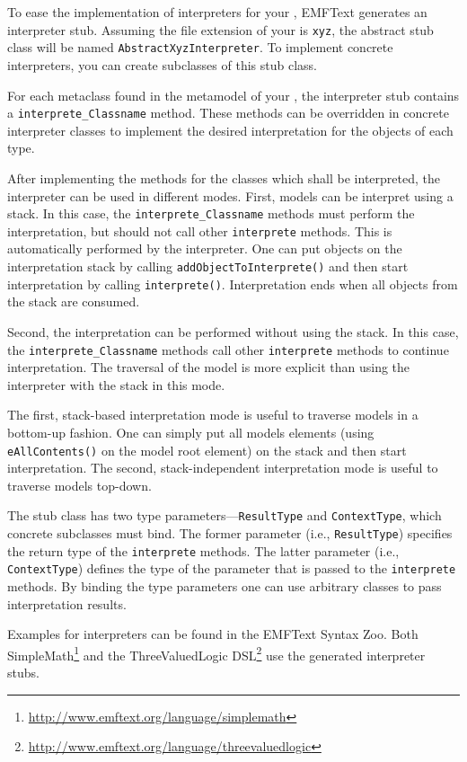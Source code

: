 To ease the implementation of interpreters for your \DSL, EMFText generates an
interpreter stub. Assuming the file extension of your \DSL is \texttt{xyz}, the
abstract stub class will be named \texttt{AbstractXyzInterpreter}. To implement
concrete interpreters, you can create subclasses of this stub class.

For each metaclass found in the metamodel of your \DSL, the interpreter
stub contains a \texttt{interprete\_Classname} method. These methods can be
overridden in concrete interpreter classes to implement the desired interpretation for the
objects of each type.

After implementing the methods for the classes which shall be interpreted, the
interpreter can be used in different modes. First, models can be interpret using
a stack. In this case, the \texttt{interprete\_Classname} methods must
perform the interpretation, but should not call other
\texttt{interprete} methods. This is automatically performed by the
interpreter. One can put objects on the interpretation stack by calling
\texttt{addObjectToInterprete()} and then start
interpretation by calling \texttt{interprete()}. Interpretation ends
when all objects from the stack are consumed.

Second, the interpretation can be performed without using the stack. In this
case, the \texttt{interprete\_Classname} methods call other
\texttt{interprete} methods to continue interpretation. The traversal of the
model is more explicit than using the interpreter with the stack in this mode.

The first, stack-based interpretation mode is useful to traverse models in a
bottom-up fashion. One can simply put all models elements (using
\texttt{eAllContents()} on the model root element) on the stack and then start
interpretation. The second, stack-independent interpretation mode is useful to
traverse models top-down.

The stub class has two type parameters---\texttt{ResultType} and
\texttt{ContextType}, which concrete subclasses must bind. The former
parameter (i.e., \texttt{ResultType}) specifies the return type of the
\texttt{interprete} methods. The latter parameter (i.e., \texttt{ContextType})
defines the type of the parameter that is passed to the \texttt{interprete}
methods. By binding the type parameters one can use arbitrary classes to pass
interpretation results.

Examples for interpreters can be found in the EMFText Syntax
Zoo. Both SimpleMath\footnote{\url{http://www.emftext.org/language/simplemath}}
and the ThreeValuedLogic
DSL\footnote{\url{http://www.emftext.org/language/threevaluedlogic}} use the
generated interpreter stubs.

